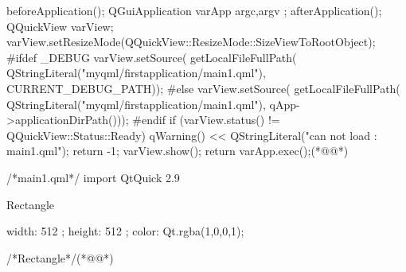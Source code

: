 \label{f000020}    %
\FloatBarrier                                  %
\begin{thebookfilesourceone}[escapeinside={(*@}{@*)},
caption=GoodLuck,
title=\filesourcenumbernameone \thefilesourcenumber
,firstnumber=67]
beforeApplication();
QGuiApplication varApp{ argc,argv };
afterApplication();
QQuickView varView;
varView.setResizeMode(QQuickView::ResizeMode::SizeViewToRootObject);
#ifdef _DEBUG
varView.setSource(
    getLocalFileFullPath(
        QStringLiteral("myqml/firstapplication/main1.qml"),
        CURRENT_DEBUG_PATH));
#else
varView.setSource(
    getLocalFileFullPath(
        QStringLiteral("myqml/firstapplication/main1.qml"),
        qApp->applicationDirPath()));
#endif
if (varView.status() != QQuickView::Status::Ready) {
    qWarning() << QStringLiteral("can not load : main1.qml");
    return -1;
}
varView.show();
return varApp.exec();(*@\marginpar[\hfill\setlength\fboxsep{2pt}\fbox{\footnotesize{\kaishu\parbox{1em}{\setlength{\baselineskip}{2pt}\filesourcenumbernameone}}\footnotesize{\thefilesourcenumber}}]{\setlength\fboxsep{2pt}\fbox{\footnotesize{\kaishu\parbox{1em}{\setlength{\baselineskip}{2pt}\filesourcenumbernameone}}\footnotesize{\thefilesourcenumber}}}@*)\end{thebookfilesourceone}          %
\addtocounter{lstlisting}{-1}   %
\label{f000023}    %
\FloatBarrier                                  %
\begin{thebookfilesourceone}[escapeinside={(*@}{@*)},
caption=GoodLuck,
title=\filesourcenumbernameone \thefilesourcenumber
]
/*main1.qml*/
import QtQuick 2.9

Rectangle{

    width: 512 ;
    height: 512 ;
    color: Qt.rgba(1,0,0,1);

}/*Rectangle*/(*@\marginpar[\hfill\setlength\fboxsep{2pt}\fbox{\footnotesize{\kaishu\parbox{1em}{\setlength{\baselineskip}{2pt}\filesourcenumbernameone}}\footnotesize{\thefilesourcenumber}}]{\setlength\fboxsep{2pt}\fbox{\footnotesize{\kaishu\parbox{1em}{\setlength{\baselineskip}{2pt}\filesourcenumbernameone}}\footnotesize{\thefilesourcenumber}}}@*)\end{thebookfilesourceone}          %
\addtocounter{lstlisting}{-1}   %

